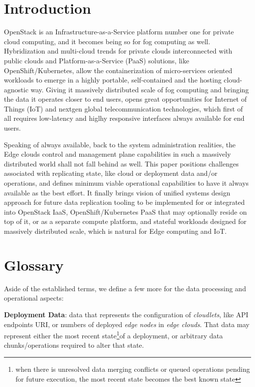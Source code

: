 \documentclass[conference]{IEEEtran}
\begin{document}
\section{Introduction}

OpenStack is an Infrastructure-as-a-Service platform number one for private
cloud computing, and it becomes being so for fog computing as well.
Hybridization and multi-cloud trends for private clouds interconnected with
public clouds and Platform-as-a-Service (PaaS) solutions, like
OpenShift/Kubernetes, allow the containerization of micro-services oriented
workloads to emerge in a highly portable, self-contained and the hosting
cloud-agnostic way. Giving it massively distributed scale of fog computing and
bringing the data it operates closer to end users, opens great opportunities
for Internet of Things (IoT) and nextgen global telecommunication technologies,
which first of all requires low-latency and higlhy responsive interfaces always
available for end users.

Speaking of always available, back to the system administration realities, the
Edge clouds control and management plane capabilities in such a massively
distributed world shall not fall behind as well. This paper positions
challenges associated with replicating state, like cloud or deployment data
and/or operations, and defines minimum viable operational capabilities to have
it always available as the best effort. It finally brings vision of unified
systems design approach for future data replication tooling to be implemented
for or integrated into OpenStack IaaS, OpenShift/Kubernetes PaaS that may
optionally reside on top of it, or as a separate compute platform, and stateful
workloads designed for massively distributed scale, which is natural for Edge
computing and IoT.

\section{Glossary}

Aside of the established terms\cite{b3}, we define a few more for the data
processing and operational aspects:

\textbf{Deployment Data}: data that represents the configuration of
\textit{cloudlets}\cite{b3}, like API endpoints URI, or numbers of deployed
\textit{edge nodes}\cite{b3} in \textit{edge clouds}\cite{b3}. That data may
represent either the most recent state\footnote{when there is unresolved data
merging conflicts or queued operations pending for future execution, the most
recent state becomes the best known state}of a deployment, or arbitrary data
chunks/operations required to alter that state.
\end{document}
